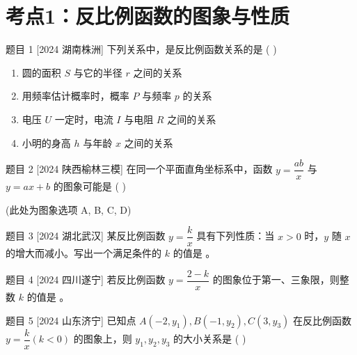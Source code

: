 \documentclass[12pt, a4paper]{article}
\begin{document}
\section*{考点1：反比例函数的图象与性质}

\begin{problem}{题目 1 [2024 湖南株洲]}
下列关系中，是反比例函数关系的是 ( \quad )
\begin{enumerate}[label=\Alph*., itemsep=0pt]
    \item 圆的面积 $S$ 与它的半径 $r$ 之间的关系
    \item 用频率估计概率时，概率 $P$ 与频率 $p$ 的关系
    \item 电压 $U$ 一定时，电流 $I$ 与电阻 $R$ 之间的关系
    \item 小明的身高 $h$ 与年龄 $x$ 之间的关系
\end{enumerate}
\end{problem}
\vspace{1cm}

\begin{problem}{题目 2 [2024 陕西榆林三模]}
在同一个平面直角坐标系中，函数 $y=\dfrac{ab}{x}$ 与 $y=ax+b$ 的图象可能是 ( \quad )
\begin{center}
    (此处为图象选项 A, B, C, D)
\end{center}
\end{problem}
\vspace{1cm}

\begin{problem}{题目 3 [2024 湖北武汉]}
某反比例函数 $y=\dfrac{k}{x}$ 具有下列性质：当 $x>0$ 时，$y$ 随 $x$ 的增大而减小。写出一个满足条件的 $k$ 的值是 \underline{\hspace{2cm}}。
\end{problem}
\vspace{1cm}

\begin{problem}{题目 4 [2024 四川遂宁]}
若反比例函数 $y=\dfrac{2-k}{x}$ 的图象位于第一、三象限，则整数 $k$ 的值是 \underline{\hspace{2cm}}。
\end{problem}
\vspace{1cm}

\begin{problem}{题目 5 [2024 山东济宁]}
已知点 $A(-2,y_1), B(-1,y_2), C(3,y_3)$ 在反比例函数 $y=\dfrac{k}{x} (k<0)$ 的图象上，则 $y_1, y_2, y_3$ 的大小关系是 ( \quad )
\end{problem}
\vspace{1cm}
\end{document}
